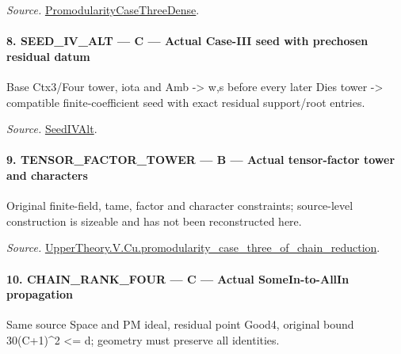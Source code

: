 \emph{Source.} \href{https://github.com/CocoSgt/riemann-hypothesis-lean/blob/7cbf7a0c32fca1badf05931879a37c3f8a2b03b4/src/Development/AutomorphicArithmetic/AutomorphicVarieties/ModularityArgument/ThresholdArguments/DenseThresholdCases/PromodularityCaseThree.lean#L40-L42}{PromodularityCaseThreeDense}.



\paragraph{8. SEED\_\allowbreak IV\_\allowbreak ALT — C — Actual Case-III seed with prechosen residual datum}

Base Ctx3/Four tower, iota and Amb -> w,s before every later Dies tower -> compatible finite-coefficient seed with exact residual support/root entries.

\emph{Source.} \href{https://github.com/CocoSgt/riemann-hypothesis-lean/blob/7cbf7a0c32fca1badf05931879a37c3f8a2b03b4/src/Development/AutomorphicArithmetic/AutomorphicVarieties/ModularityArgument/ThresholdArguments/DenseThresholdCases/PromodularityCaseThree.lean#L19-L25}{SeedIVAlt}.



\paragraph{9. TENSOR\_\allowbreak FACTOR\_\allowbreak TOWER — B — Actual tensor-factor tower and characters}

Original finite-field, tame, factor and character constraints; source-level construction is sizeable and has not been reconstructed here.

\emph{Source.} \href{https://github.com/CocoSgt/riemann-hypothesis-lean/blob/7cbf7a0c32fca1badf05931879a37c3f8a2b03b4/src/Development/AutomorphicArithmetic/AutomorphicVarieties/ModularityArgument/ThresholdArguments/DenseThresholdCases/PromodularityCaseThreeOfLemmas.lean#L131-L153}{UpperTheory.V.Cu.promodularity\_\allowbreak case\_\allowbreak three\_\allowbreak of\_\allowbreak chain\_\allowbreak reduction}.



\paragraph{10. CHAIN\_\allowbreak RANK\_\allowbreak FOUR — C — Actual SomeIn-to-AllIn propagation}

Same source Space and PM ideal, residual point Good4, original bound 30(C+1)\textasciicircum{}2 <= d; geometry must preserve all identities.

